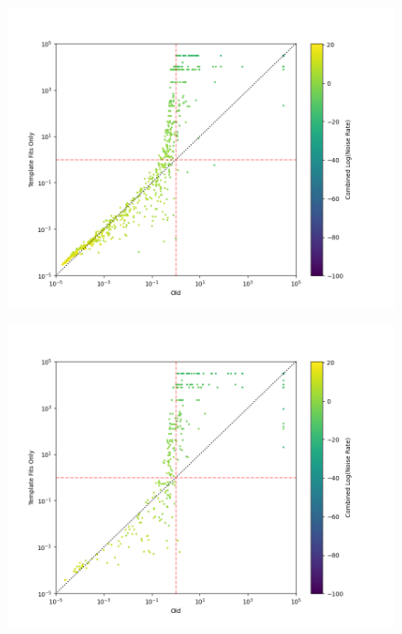 %
\begin{figure}
    \centering
    \includegraphics[width=1\textwidth]{images/5_pycbclive/ifar_vs_ifar_same_template_ids_comb_log_noise.png}
    \caption{}
    \label{fig:pycbclive-ifar-ifar-same-trigs-comb-log-noise-rate}
\end{figure}
%
\begin{figure}
    \centering
    \includegraphics[width=1\textwidth]{images/5_pycbclive/ifar_vs_ifar_diff_template_ids_comb_log_noise.png}
    \caption{}
    \label{fig:pycbclive-ifar-ifar-diff-trigs-comb-log-noise-rate}
\end{figure}
